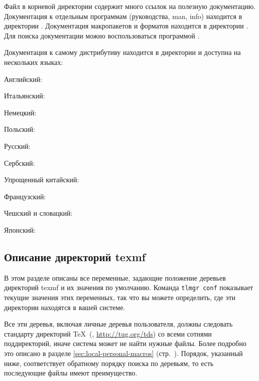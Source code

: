 \documentclass{article}
\begin{document}
Файл  в корневой директории содержит много ссылок на
полезную документацию.  
Документация к отдельным программам (руководства, man, info) находится в
директории .  Документация макропакетов и форматов
находится в директории .  Для поиска
документации можно воспользоваться программой .

Документация к самому дистрибутиву \TL{} находится в директории
 и доступна на нескольких языках:
\begin{itemize*}
\item{Английский:} 
\item{Итальянский:} 
\item{Немецкий:} 
\item{Польский:} 
\item{Русский:} 
\item{Сербский:} 
\item{Упрощенный китайский:} 
\item{Французский:} 
\item{Чешский и словацкий:} 
\item{Японский:} 
\end{itemize*}

\subsection{Описание директорий texmf}
\label{sec:texmftrees}

В этом разделе описаны все переменные, задающие положение деревьев
директорий texmf и их значения по умолчанию.  Команда
\texttt{tlmgr~conf} показывает текущие значения этих переменных,
так что вы можете определить, где эти директории находятся в
вашей системе. 


Все эти деревья, включая личные деревья пользователя, должны следовать
стандарту директорий \TeX\ (\TDS, \url{http://tug.org/tds}) со всеми
сотнями поддиректорий, иначе система может не найти нужные файлы.
Более подробно это описано в разделе \ref{sec:local-personal-macros}
(стр.~\pageref{sec:local-personal-macros}).  Порядок, указанный ниже,
соответствует обратному порядку поиска по деревьям, то есть
последующие файлы имеют преимущество.
\end{document}
